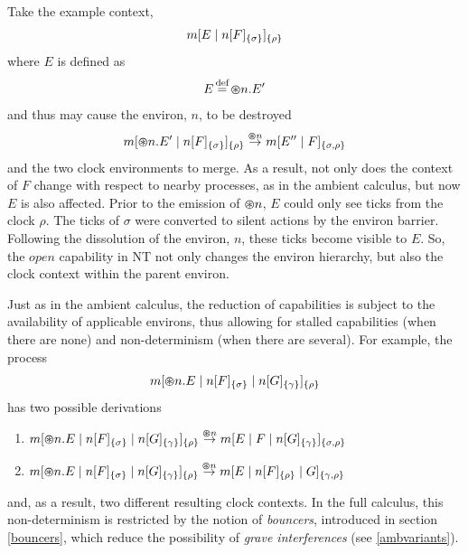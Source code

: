 Take the example context,
\begin{equation}
{m}[ E\;|\;{n}[ F ]_{\{\sigma\}} ]_{\{\rho\}}
\end{equation}
where $E$ is defined as
\begin{equation}
E \operatorname{\stackrel{\textrm{def}}{=}} \varoast n.E^\prime
\end{equation}
and thus may cause the environ, $n$, to be destroyed
\begin{equation}
{m}[ \varoast n.E^\prime \;|\;{n}[ F ]_{\{\sigma\}} ]_{\{\rho\}} \stackrel{\varoast n}{\rightarrow}
{m}[ E'^\prime\;|\;F ]_{\{\sigma, \rho\}}
\end{equation}
and the two clock environments to merge.  As a result, not
only does the context of $F$ change with respect to nearby processes, as
in the ambient calculus, but now $E$ is also affected.  Prior to the
emission of $\varoast n$, $E$ could only see ticks from the clock
$\rho$.  The ticks of $\sigma$ were converted to silent actions by the
environ barrier.  Following the dissolution of the environ, $n$, these
ticks become visible to $E$.  So, the $open$ capability in NT not only
changes the environ hierarchy, but also the clock context within the
parent environ.

Just as in the ambient calculus, the reduction of capabilities is
subject to the availability of applicable environs, thus allowing for
stalled capabilities (when there are none) and non-determinism (when
there are several). For example, the process
\begin{equation}
{m}[ \varoast n.E\;|\;{n}[ F ]_{\{\sigma\}}\;|\;{n}[ G ]_{\{\gamma\}} ]_{\{\rho\}}
\end{equation}
has two possible derivations

\begin{enumerate}
\item
      ${m}[ \varoast n.E\;|\;{n}[ F ]_{\{\sigma\}}\;|\;{n}[ G ]_{\{\gamma\}} ]_{\{\rho\}}
      \stackrel{\varoast n}{\rightarrow} {m}[ E \;|\; F \;|\;
      {n}[ G ]_{\{\gamma\}} ]_{\{\sigma , \rho\}}$
\item
      ${m}[ \varoast n.E\;|\;{n}[ F ]_{\{\sigma\}}\;|\;{n}[ G ]_{\{\gamma\}} ]_{\{\rho\}}
      \stackrel{\varoast n}{\rightarrow} {m}[ E \;|\; {n}[ F ]_{\{\rho\}} \;|\; G ]_{\{\gamma , \rho\}}$
\end{enumerate}
and, as a result, two different resulting clock contexts.  In the full
calculus, this non-determinism is restricted by the notion of
\emph{bouncers}, introduced in section \ref{bouncers}, which reduce
the possibility of \emph{grave interferences} (see \ref{ambvariants}).

